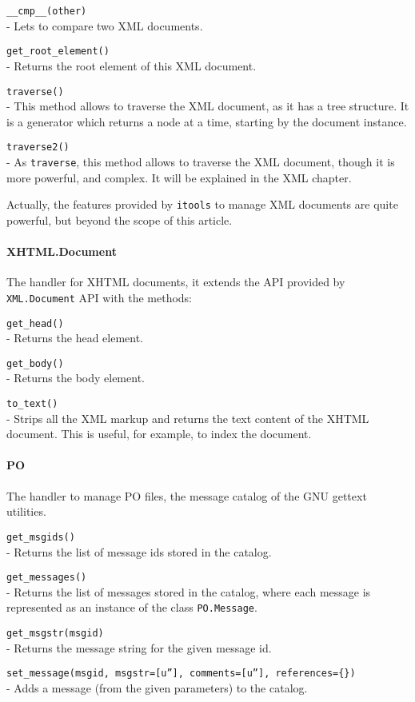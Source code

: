 \begin{api}
  {\tt \_\_cmp\_\_(other)}\\
  - Lets to compare two XML documents.

  {\tt get\_root\_element()}\\
  - Returns the root element of this XML document.

  {\tt traverse()}\\
  - This method allows to traverse the XML document, as it has a tree
    structure. It is a generator which returns a node at a time, starting
    by the document instance.

  {\tt traverse2()}\\
  - As {\tt traverse}, this method allows to traverse the XML document,
    though it is more powerful, and complex. It will be explained in the
    XML chapter.
\end{api}

Actually, the features provided by {\tt itools} to manage XML documents
are quite powerful, but beyond the scope of this article.

\paragraph{XHTML.Document}

The handler for XHTML documents, it extends the API provided by
{\tt XML.Document} API with the methods:

\begin{api}
  {\tt get\_head()}\\
  - Returns the head element.

  {\tt get\_body()}\\
  - Returns the body element.

  {\tt to\_text()}\\
  - Strips all the XML markup and returns the text content of the XHTML
    document. This is useful, for example, to index the document.
\end{api}

\paragraph{PO}

The handler to manage PO files, the message catalog of the GNU gettext
utilities.

\begin{api}
  {\tt get\_msgids()}\\
  - Returns the list of message ids stored in the catalog.

  {\tt get\_messages()}\\
  - Returns the list of messages stored in the catalog, where each message
    is represented as an instance of the class {\tt PO.Message}.

  {\tt get\_msgstr(msgid)}\\
  - Returns the message string for the given message id.

  {\tt set\_message(msgid, msgstr=[u''], comments=[u''], references=\{\})}\\
  - Adds a message (from the given parameters) to the catalog.
\end{api}

